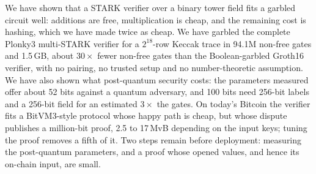 \documentclass[11pt]{article}
\begin{document}
We have shown that a STARK verifier over a binary tower field fits a garbled
circuit well: additions are free, multiplication is cheap, and the remaining cost
is hashing, which we have made twice as cheap. We have garbled the complete
Plonky3 multi-STARK verifier for a $2^{18}$-row Keccak trace in 94.1M non-free
gates and 1.5\,GB, about $30\times$ fewer non-free gates than the Boolean-garbled
Groth16 verifier, with no pairing, no trusted setup and no number-theoretic
assumption. We have also shown what post-quantum security costs: the parameters
measured offer about 52 bits against a quantum adversary, and 100 bits need
256-bit labels and a 256-bit field for an estimated $3\times$ the gates. On
today's Bitcoin the verifier fits a BitVM3-style protocol whose happy path is
cheap, but whose dispute publishes a million-bit proof, 2.5 to 17\,MvB depending
on the input keys; tuning the proof removes a fifth of it. Two steps remain before
deployment: measuring the post-quantum parameters, and a proof whose opened
values, and hence its on-chain input, are small.


{\raggedright}
\end{document}
